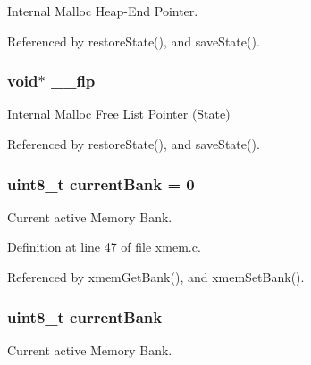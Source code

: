 Internal Malloc Heap-\/\-End Pointer. 



Referenced by restore\-State(), and save\-State().

\hypertarget{group__xmem_gadc2de04ee0c18717273d0ab52fd6dc1b}{
\subsubsection[{\-\_\-\-\_\-flp}]{\setlength{\rightskip}{0pt plus 5cm}void$\ast$ \-\_\-\-\_\-flp}}\label{group__xmem_gadc2de04ee0c18717273d0ab52fd6dc1b}


Internal Malloc Free List Pointer (State) 



Referenced by restore\-State(), and save\-State().

\hypertarget{group__xmem_ga4a1acf2db179d35f089bd00881d1c2eb}{
\subsubsection[{current\-Bank}]{\setlength{\rightskip}{0pt plus 5cm}uint8\-\_\-t current\-Bank = 0}}\label{group__xmem_ga4a1acf2db179d35f089bd00881d1c2eb}


Current active Memory Bank. 



Definition at line 47 of file xmem.\-c.



Referenced by xmem\-Get\-Bank(), and xmem\-Set\-Bank().

\hypertarget{group__xmem_ga4a1acf2db179d35f089bd00881d1c2eb}{
\subsubsection[{current\-Bank}]{\setlength{\rightskip}{0pt plus 5cm}uint8\-\_\-t current\-Bank}}\label{group__xmem_ga4a1acf2db179d35f089bd00881d1c2eb}


Current active Memory Bank. 




